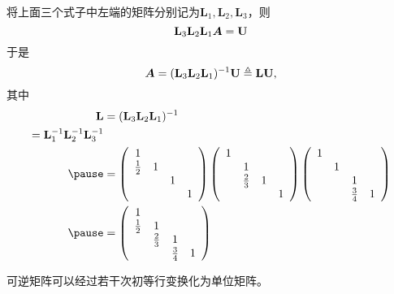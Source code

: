 \begin{frame}
  \begin{jie}[续]
    将上面三个式子中左端的矩阵分别记为$\mathbf{L}_1,\mathbf{L}_2,\mathbf{L}_3$，则
    $$
    \mathbf{L}_3\mathbf{L}_2\mathbf{L}_1 \boldsymbol{A} = \mathbf{U}
    $$\pause 
    于是
    $$
    \boldsymbol{A} = (\mathbf{L}_3\mathbf{L}_2\mathbf{L}_1)^{-1}\mathbf{U} \triangleq \mathbf{L}\mathbf{U},
    $$\pause
    其中
    $$
    \begin{aligned}
      \mathbf{L}
      &=  (\mathbf{L}_3\mathbf{L}_2\mathbf{L}_1)^{-1} \\ =  \mathbf{L}_1^{-1}\mathbf{L}_2^{-1}\mathbf{L}_3^{-1}\\ \pause
      &=   
      \left(
        \begin{array}{cccc}
          1 & && \\
          \frac12 &1&&\\
            &&1&\\
            &&&1
        \end{array}
      \right)
      \left(
        \begin{array}{cccc}
          1 & && \\
            &1&&\\
            &\frac23&1&\\
            &&&1
        \end{array}
      \right)
      \left(
        \begin{array}{cccc}
          1 & && \\
            &1&&\\
            &&1&\\
            &&\frac34&1
        \end{array}
      \right) \\ \pause
      &=   \left(
        \begin{array}{cccc}
          1 & && \\
          \frac12 &1&&\\
            &\frac23&1&\\
            &&\frac34&1
        \end{array}
      \right)
    \end{aligned}    
    $$
  \end{jie}
  
\end{frame}



\begin{frame}
  
  \begin{dingli}
    可逆矩阵可以经过若干次初等行变换化为单位矩阵。
  \end{dingli}
\end{frame}



